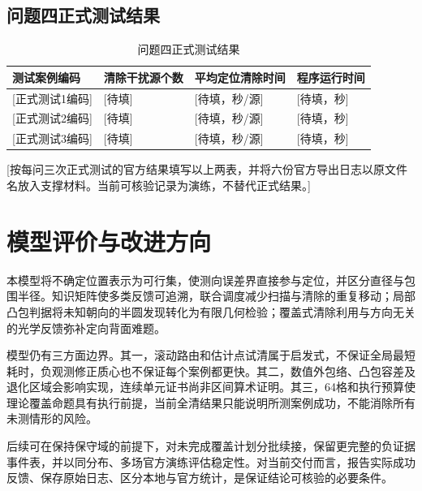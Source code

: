 \subsection{问题四正式测试结果}
\begin{table}[htbp]\centering\small
\caption{问题四正式测试结果}
\begin{tabular}{llll}\toprule
测试案例编码&清除干扰源个数&平均定位清除时间&程序运行时间\\\midrule
{[正式测试1编码]}&[待填]&[待填，秒/源]&[待填，秒]\\
{[正式测试2编码]}&[待填]&[待填，秒/源]&[待填，秒]\\
{[正式测试3编码]}&[待填]&[待填，秒/源]&[待填，秒]\\\bottomrule
\end{tabular}\end{table}
[按每问三次正式测试的官方结果填写以上两表，并将六份官方导出日志以原文件名放入支撑材料。当前可核验记录为演练，不替代正式结果。]

\section{模型评价与改进方向}
本模型将不确定位置表示为可行集，使测向误差界直接参与定位，并区分直径与包围半径。知识矩阵使多类反馈可追溯，联合调度减少扫描与清除的重复移动；局部凸包判据将未知朝向的半圆发现转化为有限几何检验；覆盖式清除利用与方向无关的光学反馈弥补定向背面难题。

模型仍有三方面边界。其一，滚动路由和估计点试清属于启发式，不保证全局最短耗时，负观测修正质心也不保证每个案例都更快。其二，数值外包络、凸包容差及退化区域会影响实现，连续单元证书尚非区间算术证明。其三，64格和执行预算使理论覆盖命题具有执行前提，当前全清结果只能说明所测案例成功，不能消除所有未测情形的风险。

后续可在保持保守域的前提下，对未完成覆盖计划分批续接，保留更完整的负证据事件表，并以同分布、多场官方演练评估稳定性。对当前交付而言，报告实际成功反馈、保存原始日志、区分本地与官方统计，是保证结论可核验的必要条件。
